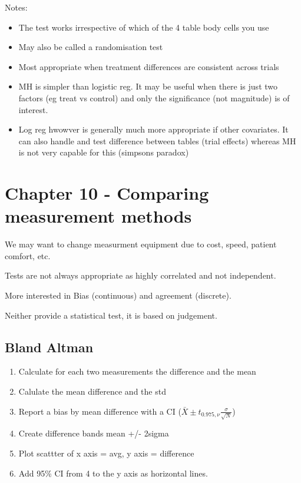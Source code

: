\documentclass[
  letterpaper,
  DIV=11,
  numbers=noendperiod]{scrreprt}
\providecommand{\tightlist}{%
  \setlength{\itemsep}{0pt}\setlength{\parskip}{0pt}}\usepackage{longtable,booktabs,array}
\begin{document}
Notes:

\begin{itemize}
\tightlist
\item
  The test works irrespective of which of the 4 table body cells you use
\item
  May also be called a randomisation test
\item
  Most appropriate when treatment differences are consistent across
  trials
\item
  MH is simpler than logistic reg. It may be useful when there is just
  two factors (eg treat vs control) and only the significance (not
  magnitude) is of interest.
\item
  Log reg hwowver is generally much more appropriate if other
  covariates. It can also handle and test difference between tables
  (trial effects) whereas MH is not very capable for this (simpsons
  paradox)
\end{itemize}

\hypertarget{chapter-10---comparing-measurement-methods}{%
\section{Chapter 10 - Comparing measurement
methods}\label{chapter-10---comparing-measurement-methods}}

We may want to change measurment equipment due to cost, speed, patient
comfort, etc.

Tests are not always appropriate as highly correlated and not
independent.

More interested in Bias (continuous) and agreement (discrete).

Neither provide a statistical test, it is based on judgement.

\hypertarget{bland-altman}{%
\subsection{Bland Altman}\label{bland-altman}}

\begin{enumerate}
\def\labelenumi{\arabic{enumi})}
\tightlist
\item
  Calculate for each two measurements the difference and the mean
\item
  Calulate the mean difference and the std
\item
  Report a bias by mean difference with a CI
  (\(\bar{X} \pm t_{0.975, \nu} \frac{\sigma}{\sqrt{N}}\))
\item
  Create difference bands mean +/- 2sigma
\item
  Plot scattter of x axis = avg, y axis = difference
\item
  Add 95\% CI from 4 to the y axis as horizontal lines.
\end{enumerate}
\end{document}
